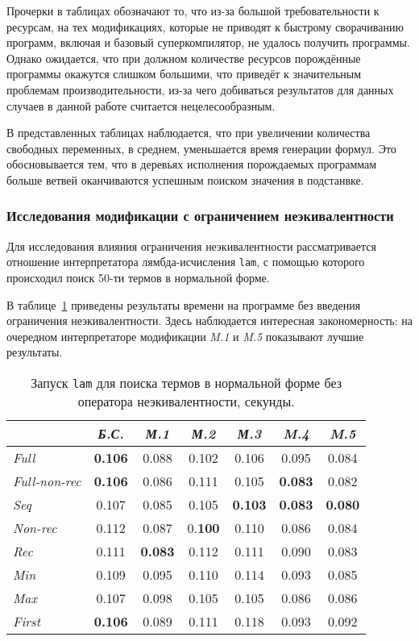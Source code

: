 Прочерки в таблицах обозначают то, что из-за большой требовательности к ресурсам,
на тех модификациях, которые не приводят к быстрому сворачиванию программ,
включая и базовый суперкомпилятор, не удалось получить программы. Однако ожидается,
что при должном количестве ресурсов порождённые программы окажутся слишком большими,
что приведёт к значительным проблемам производительности, из-за чего добиваться результатов
для данных случаев в данной работе считается нецелесообразным.

В представленных таблицах наблюдается, что при увеличении количества свободных переменных,
в среднем, уменьшается время генерации формул. Это обосновывается тем, что в
деревьях исполнения порождаемых программам больше ветвей оканчиваются успешным
поиском значения в подстанвке.

\subsubsection{Исследования модификации с ограничением неэкивалентности}

Для исследования влияния ограничения неэкивалентности рассматривается отношение
интерпретатора лямбда-исчисления \lstinline{lam}, с помощью которого
происходил поиск 50-ти термов в нормальной форме.

В таблице~\ref{fig:lamTestSimple} приведены результаты времени на программе
без введения ограничения неэкивалентности. Здесь наблюдается интересная закономерность:
на очередном интерпретаторе модификации {\it M.1} и {\it M.5} показывают лучшие результаты.

\begin{table}[h!]
\center
\begin{tabular}{|l|c|c|c|c|c|c|}
\hline
   &{\it Б.С.}&{\it М.1}&{\it М.2}&{\it М.3}&{\it M.4}&{\it M.5} \\ \hline

{\it Full        } & {\bf 0.106}& 0.088     & 0.102       & 0.106       & 0.095       & 0.084 \\ \hline
{\it Full-non-rec} & {\bf 0.106}& 0.086     & 0.111       & 0.105       & {\bf 0.083} & 0.082 \\ \hline
{\it Seq         } & 0.107      & 0.085     & 0.105       & {\bf 0.103} & {\bf 0.083} & {\bf 0.080} \\ \hline
{\it Non-rec     } & 0.112      & 0.087     & 0.{\bf 100} & 0.110       & 0.086       & 0.084 \\ \hline
{\it Rec         } & 0.111      &{\bf 0.083}& 0.112       & 0.111       & 0.090       & 0.083 \\ \hline
{\it Min         } & 0.109      & 0.095     & 0.110       & 0.114       & 0.093       & 0.085 \\ \hline
{\it Max         } & 0.107      & 0.098     & 0.105       & 0.105       & 0.086       & 0.086 \\ \hline
{\it First       } & {\bf 0.106}& 0.089     & 0.111       & 0.118       & 0.093       & 0.092 \\ \hline
\end{tabular}
\caption{Запуск \lstinline{lam} для поиска термов в нормальной форме без оператора неэкивалентности, секунды.}
\label{fig:lamTestSimple}
\end{table}

